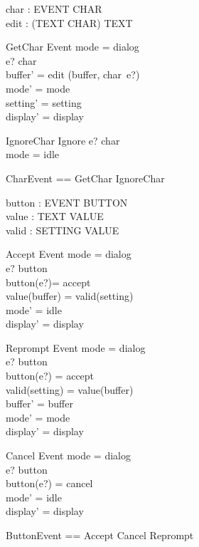 \documentclass{llncs}
\begin{document}
\begin{axdef}
char : EVENT \pfun CHAR \\
edit : (TEXT \cross CHAR) \fun TEXT
\end{axdef}
\begin{schema}{GetChar}
Event 
\where mode = dialog \\
e? \in \dom char \\
buffer' = edit (buffer, char~e?) \\
mode' = mode \\
setting' = setting \\
display' = display
\end{schema}
\begin{schema}{IgnoreChar}
Ignore 
\where e? \in \dom char \\
mode = idle
\end{schema}
\begin{zed}
CharEvent == GetChar \lor IgnoreChar
\end{zed}

\begin{axdef}
button : EVENT \pfun BUTTON \\
value : TEXT \fun VALUE \\
valid : SETTING \rel VALUE
\end{axdef}
\begin{schema}{Accept}
Event 
\where mode = dialog \\
e? \in \dom button \\
button(e?)= accept \\
value(buffer) = valid(setting)\\
mode' = idle \\
display' = display
\end{schema}
\begin{schema}{Reprompt}
Event 
\where mode = dialog \\
e? \in \dom button \\
button(e?) = accept \\
\lnot valid(setting) = value(buffer)\\
buffer' = buffer \\
mode' = mode \\
display' = display
\end{schema}
\begin{schema}{Cancel}
Event 
\where mode = dialog \\
e? \in \dom button \\
button(e?) = cancel \\
mode' = idle \\
display' = display
\end{schema}
\begin{zed}
ButtonEvent == Accept \lor Cancel \lor Reprompt
\end{zed}
\end{document}
